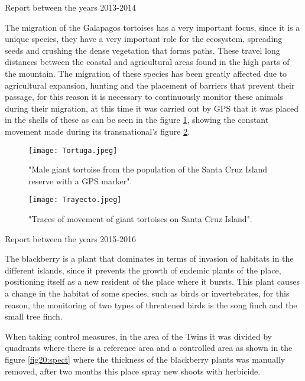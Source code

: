 \documentclass[10pt,english, openany]{book}
\begin{document}
Report between the years 2013-2014

The migration of the Galapagos tortoises has a very important focus, since it is a unique species, they have a very important role for the ecosystem, spreading seeds and crushing the dense vegetation that forms paths. These travel long distances between the coastal and agricultural areas found in the high parts of the mountain.
The migration of these species has been greatly affected due to agricultural expansion, hunting and the placement of barriers that prevent their passage, for this reason it is necessary to continuously monitor these animals during their migration, at this time it was carried out by GPS that it was placed in the shells of these as can be seen in the figure \ref{fig18:spect}, showing the constant movement made during its transnational's figure \ref{fig19:spect}.\cite{1389}

\begin{figure}[h!]
    \centering
    \texttt{[image: Tortuga.jpeg]}
    \caption{"Male giant tortoise from the population of the Santa Cruz Island reserve with a GPS marker".\cite{1389}}
    \label{fig18:spect}
\end{figure}

\pagebreak

\begin{figure}[h!]
    \centering
    \texttt{[image: Trayecto.jpeg]}
    \caption{"Traces of movement of giant tortoises on Santa Cruz Island".\cite{1389}}
    \label{fig19:spect}
\end{figure}

\pagebreak

Report between the years 2015-2016

The blackberry is a plant that dominates in terms of invasion of habitats in the different islands, since it prevents the growth of endemic plants of the place, positioning itself as a new resident of the place where it bursts. This plant causes a change in the habitat of some species, such as birds or invertebrates, for this reason, the monitoring of two types of threatened birds is the song finch and the small tree finch.\cite{2016}

When taking control measures, in the area of the Twins it was divided by quadrants where there is a reference area and a controlled area as shown in the figure \ref{fig20:spect} where the thickness of the blackberry plants was manually removed, after two months this place spray new shoots with herbicide.\cite{2016}
\end{document}
